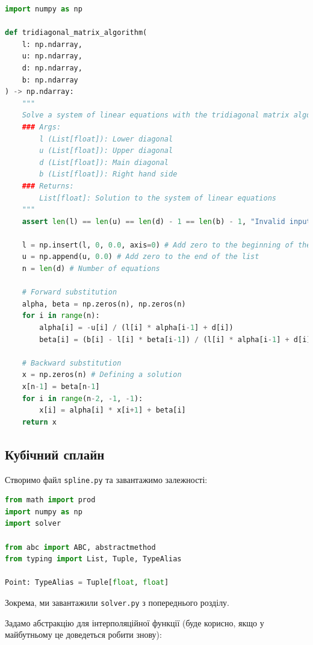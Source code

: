 \documentclass[12pt]{extarticle}
\begin{document}
\begin{lstlisting}[language=Python, caption=Реалізація методу прогонки]
import numpy as np

def tridiagonal_matrix_algorithm(
    l: np.ndarray, 
    u: np.ndarray, 
    d: np.ndarray, 
    b: np.ndarray
) -> np.ndarray:
    """
    Solve a system of linear equations with the tridiagonal matrix algorithm.
    ### Args:
        l (List[float]): Lower diagonal
        u (List[float]): Upper diagonal
        d (List[float]): Main diagonal
        b (List[float]): Right hand side
    ### Returns:
        List[float]: Solution to the system of linear equations
    """
    assert len(l) == len(u) == len(d) - 1 == len(b) - 1, "Invalid input shapes"
    
    l = np.insert(l, 0, 0.0, axis=0) # Add zero to the beginning of the list
    u = np.append(u, 0.0) # Add zero to the end of the list
    n = len(d) # Number of equations
     
    # Forward substitution
    alpha, beta = np.zeros(n), np.zeros(n)
    for i in range(n):
        alpha[i] = -u[i] / (l[i] * alpha[i-1] + d[i])
        beta[i] = (b[i] - l[i] * beta[i-1]) / (l[i] * alpha[i-1] + d[i])
      
    # Backward substitution
    x = np.zeros(n) # Defining a solution
    x[n-1] = beta[n-1]
    for i in range(n-2, -1, -1):
        x[i] = alpha[i] * x[i+1] + beta[i]
    return x
\end{lstlisting}

\subsection{Кубічний сплайн}

Створимо файл \texttt{spline.py} та завантажимо залежності:

\begin{lstlisting}[language=Python, caption=Завантаження залежностей]
from math import prod
import numpy as np
import solver

from abc import ABC, abstractmethod
from typing import List, Tuple, TypeAlias

Point: TypeAlias = Tuple[float, float]
\end{lstlisting}

Зокрема, ми завантажили \texttt{solver.py} з попереднього розділу.

Задамо абстракцію для інтерполяційної функції (буде корисно, якщо у майбутньому це доведеться робити знову):
\end{document}

